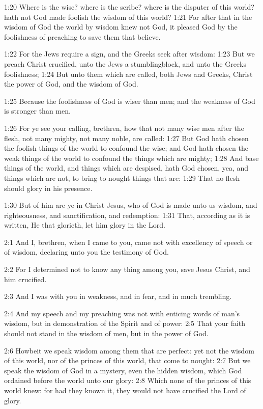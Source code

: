 1:20 Where is the wise? where is the scribe? where is the disputer of
this world? hath not God made foolish the wisdom of this world?  1:21
For after that in the wisdom of God the world by wisdom knew not God,
it pleased God by the foolishness of preaching to save them that
believe.

1:22 For the Jews require a sign, and the Greeks seek after wisdom:
1:23 But we preach Christ crucified, unto the Jews a stumblingblock,
and unto the Greeks foolishness; 1:24 But unto them which are called,
both Jews and Greeks, Christ the power of God, and the wisdom of God.

1:25 Because the foolishness of God is wiser than men; and the
weakness of God is stronger than men.

1:26 For ye see your calling, brethren, how that not many wise men
after the flesh, not many mighty, not many noble, are called: 1:27 But
God hath chosen the foolish things of the world to confound the wise;
and God hath chosen the weak things of the world to confound the
things which are mighty; 1:28 And base things of the world, and things
which are despised, hath God chosen, yea, and things which are not, to
bring to nought things that are: 1:29 That no flesh should glory in
his presence.

1:30 But of him are ye in Christ Jesus, who of God is made unto us
wisdom, and righteousness, and sanctification, and redemption: 1:31
That, according as it is written, He that glorieth, let him glory in
the Lord.

2:1 And I, brethren, when I came to you, came not with excellency of
speech or of wisdom, declaring unto you the testimony of God.

2:2 For I determined not to know any thing among you, save Jesus
Christ, and him crucified.

2:3 And I was with you in weakness, and in fear, and in much
trembling.

2:4 And my speech and my preaching was not with enticing words of
man's wisdom, but in demonstration of the Spirit and of power: 2:5
That your faith should not stand in the wisdom of men, but in the
power of God.

2:6 Howbeit we speak wisdom among them that are perfect: yet not the
wisdom of this world, nor of the princes of this world, that come to
nought: 2:7 But we speak the wisdom of God in a mystery, even the
hidden wisdom, which God ordained before the world unto our glory: 2:8
Which none of the princes of this world knew: for had they known it,
they would not have crucified the Lord of glory.

